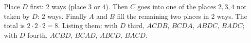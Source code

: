 Place $D$ first: $2$ ways (place $3$ or $4$). Then $C$ goes into one of the places $2,3,4$ not taken by $D$: $2$ ways. Finally $A$ and $B$ fill the remaining two places in $2$ ways. The total is $2\cdot2\cdot2=\boxed{8}$. Listing them: with $D$ third, $ACDB$, $BCDA$, $ABDC$, $BADC$; with $D$ fourth, $ACBD$, $BCAD$, $ABCD$, $BACD$.
